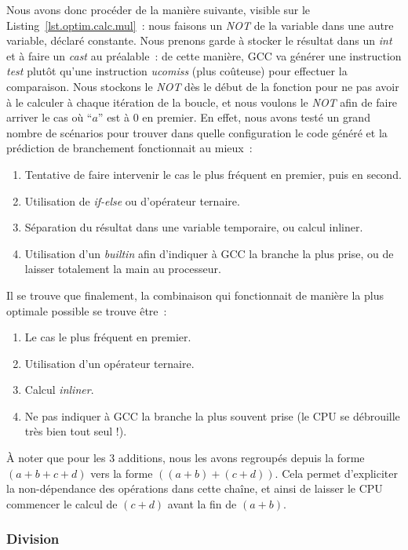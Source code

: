 \documentclass[12pt,a4paper]{article}
\begin{document}
Nous avons donc procéder de la manière suivante, visible sur le
Listing~\ref{lst.optim.calc.mul} : nous faisons un \textit{NOT} de la variable
dans une autre variable, déclaré constante. Nous prenons garde à stocker le
résultat dans un \textit{int} et à faire un \textit{cast} au préalable : de
cette manière, \ac{GCC} va générer une instruction \textit{test} plutôt qu’une
instruction \textit{ucomiss} (plus coûteuse) pour effectuer la comparaison. Nous
stockons le \textit{NOT} dès le début de la fonction pour ne pas avoir à le
calculer à chaque itération de la boucle, et nous voulons le \textit{NOT} afin
de faire arriver le cas où \enquote{$a$} est à 0 en premier. En effet, nous
avons testé un grand nombre de scénarios pour trouver dans quelle configuration
le code généré et la prédiction de branchement fonctionnait au mieux :
\begin{enumerate} \item Tentative de faire intervenir le cas le plus fréquent en
            premier, puis en second. \item Utilisation de \textit{if-else} ou
            d’opérateur ternaire. \item Séparation du résultat dans une variable
            temporaire, ou calcul inliner. \item Utilisation d’un
                \textit{builtin} afin d’indiquer à \ac{GCC} la branche la plus
prise, ou de laisser totalement la main au processeur. \end{enumerate} Il se
trouve que finalement, la combinaison qui fonctionnait de manière la plus
optimale possible se trouve être : \begin{enumerate} \item Le cas le plus
        fréquent en premier. \item Utilisation d’un opérateur ternaire. \item
        Calcul \textit{inliner}. \item Ne pas indiquer à \ac{GCC} la branche la
            plus souvent prise (le \acs{CPU} se débrouille très bien tout seul
!). \end{enumerate}

À noter que pour les 3 additions, nous les avons regroupés depuis la forme $(a +
b + c + d)$ vers la forme $((a + b) + (c + d))$. Cela permet d’expliciter la
non-dépendance des opérations dans cette chaîne, et ainsi de laisser le
\acs{CPU} commencer le calcul de $(c + d)$ avant la fin de $(a + b)$.

\subsubsection{Division}
\label{sub.optim.calc.div}
\end{document}
